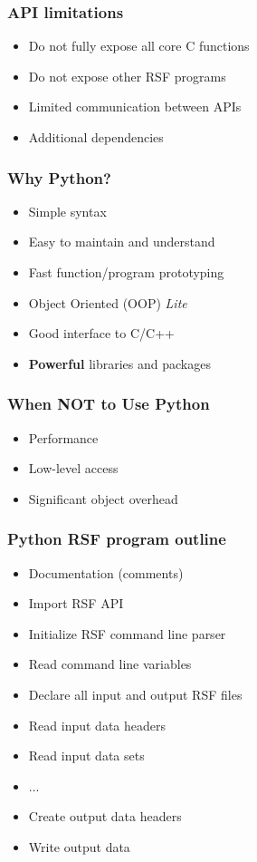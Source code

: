 \begin{frame} \frametitle{API limitations}
\begin{itemize}
\item Do not fully expose all core C functions
\pause
\item Do not expose other RSF programs
\pause
\item Limited communication between APIs
\pause
\item Additional dependencies
\end{itemize}
\end{frame}

\begin{frame}
\end{frame}

\begin{frame} \frametitle{Why Python?}
\begin{itemize}
\item Simple syntax
\item Easy to maintain and understand
\item Fast function/program prototyping
\item Object Oriented (OOP) \emph{Lite}
\item Good interface to C/C++
\item \textbf{Powerful} libraries and packages
\end{itemize}
\end{frame}

\begin{frame}
\end{frame}

\begin{frame} \frametitle{When NOT to Use Python}
\begin{itemize}
\item Performance
\item Low-level access
\item Significant object overhead 
\end{itemize}
\end{frame}

\begin{frame} \frametitle{Python RSF program outline}
\begin{itemize}
\item Documentation (comments)
\item Import RSF API
\item Initialize RSF command line parser
\item Read command line variables
\item Declare all input and output RSF files
\item Read input data headers
\item Read input data sets
\item ...
\item Create output data headers
\item Write output data
\end{itemize}
\end{frame}

